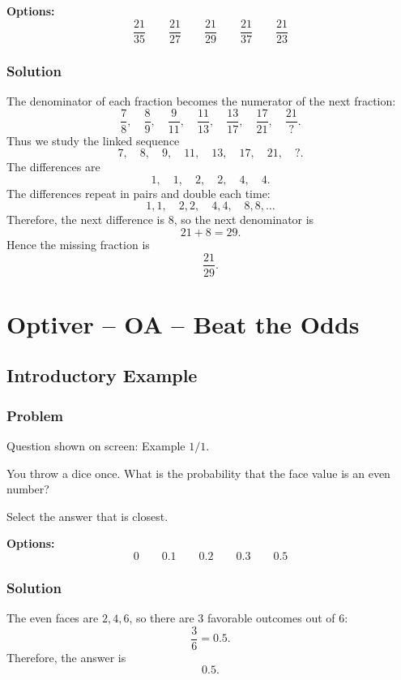 \documentclass[12pt]{article}
\begin{document}
\noindent\textbf{Options:}
\[
\boxed{\frac{21}{35}}
\qquad
\boxed{\frac{21}{27}}
\qquad
\boxed{\frac{21}{29}}
\qquad
\boxed{\frac{21}{37}}
\qquad
\boxed{\frac{21}{23}}
\]

\subsubsection{Solution}
The denominator of each fraction becomes the numerator of the next fraction:
\[
\frac{7}{8},\quad \frac{8}{9},\quad \frac{9}{11},\quad \frac{11}{13},\quad \frac{13}{17},\quad \frac{17}{21},\quad \frac{21}{?}.
\]
Thus we study the linked sequence
\[
7,\quad 8,\quad 9,\quad 11,\quad 13,\quad 17,\quad 21,\quad ?.
\]
The differences are
\[
1,\quad 1,\quad 2,\quad 2,\quad 4,\quad 4.
\]
The differences repeat in pairs and double each time:
\[
1,1,\quad 2,2,\quad 4,4,\quad 8,8,\ldots
\]
Therefore, the next difference is \(8\), so the next denominator is
\[
21+8=29.
\]
Hence the missing fraction is
\[
\boxed{\frac{21}{29}}.
\]

\newpage
\section{Optiver -- OA -- Beat the Odds}

\subsection{Introductory Example}
\subsubsection{Problem}
Question shown on screen: Example \(1/1\).

You throw a dice once. What is the probability that the face value is an even number?

Select the answer that is closest.

\noindent\textbf{Options:}
\[
\boxed{0}
\qquad
\boxed{0.1}
\qquad
\boxed{0.2}
\qquad
\boxed{0.3}
\qquad
\boxed{0.5}
\]

\subsubsection{Solution}
The even faces are \(2,4,6\), so there are \(3\) favorable outcomes out of \(6\):
\[
\frac{3}{6}=0.5.
\]
Therefore, the answer is
\[
\boxed{0.5}.
\]
\end{document}

